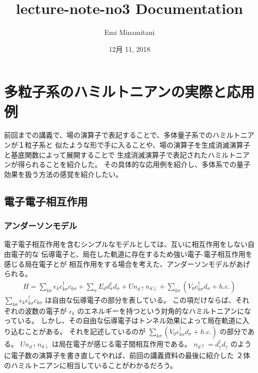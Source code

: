 \documentclass[letterpaper,10pt,dvipdfmx]{sphinxmanual}
\title{lecture-note-no3 Documentation}
\date{12月 11, 2018}
\author{Emi Minamitani}
\begin{document}
\maketitle
\sphinxtableofcontents
{}\label{\detokenize{index::doc}}



\chapter{多粒子系のハミルトニアンの実際と応用例}
\label{\detokenize{index:id1}}\label{\detokenize{index:id2}}
前回までの講義で、場の演算子で表記することで、多体量子系でのハミルトニアンが１粒子系と
似たような形で手に入ることや、場の演算子を生成消滅演算子と基底関数によって展開することで
生成消滅演算子で表記されたハミルトニアンが得られることを紹介した。
その具体的な応用例を紹介し、多体系での量子効果を扱う方法の感覚を紹介したい。


\section{電子電子相互作用}
\label{\detokenize{index:id3}}

\subsection{アンダーソンモデル}
\label{\detokenize{index:id4}}
電子電子相互作用を含むシンプルなモデルとしては、互いに相互作用をしない自由電子的な
伝導電子と、局在した軌道に存在するため強い電子-電子相互作用を感じる局在電子とが
相互作用をする場合を考えた、アンダーソンモデルがあげられる。
\begin{equation*}
\begin{split}H=\sum_{k\sigma} \epsilon_k c_{k\sigma}^\dagger c_{k\sigma}+\sum_{\sigma}E_d d_{\sigma}^\dagger
d_{\sigma} +Un_{d\uparrow}n_{d\downarrow} +\sum_{k\sigma}(V_{0}
c_{k\sigma}^\dagger d_{\sigma} + h.c.)\end{split}
\end{equation*}
\(\sum_{k\sigma} \epsilon_k c_{k\sigma}^\dagger c_{k\sigma}\)
は自由な伝導電子の部分を表している。
この項だけならば、それぞれの波数の電子が
\(\epsilon_k\)
のエネルギーを持つという対角的なハミルトニアンになっている。
しかし、その自由な伝導電子はトンネル効果によって局在軌道に入り込むことがある。
それを記述しているのが
\(\sum_{k\sigma}(V_{0} c_{k\sigma}^\dagger d_{\sigma} + h.c.)\)
の部分である。
\(Un_{d\uparrow}n_{d\downarrow}\)
は局在電子が感じる電子間相互作用である。
\(n_{d\uparrow}=d^\dagger_\uparrow d_\uparrow\)
のように電子数の演算子を書き直してやれば、前回の講義資料の最後に紹介した
２体のハミルトニアンに相当していることがわかるだろう。
\end{document}

